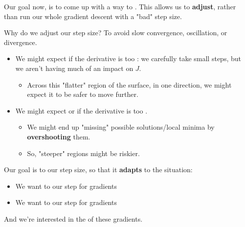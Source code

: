             Our goal now, is to come up with a  way to . This allows us to \textbf{adjust}, rather than run our whole gradient descent with a "bad" step size.

            Why do we adjust our step size? To avoid slow convergence, oscillation, or divergence.

            \begin{itemize}
                \item We might expect  if the derivative is too : we carefully take small steps, but we aren't having much of an impact on $J$.

                    \begin{itemize}
                        \item Across this "flatter" region of the surface, in one direction, we might expect it to be safer to move further.
                    \end{itemize}

                \item We might expect  or  if the derivative is too .
                    \begin{itemize}
                        \item We might end up "missing" possible solutions/local minima by \textbf{overshooting} them.
                        \item So, "steeper" regions might be riskier.
                    \end{itemize}
            \end{itemize}

            \begin{concept}
                Our goal is to  our step size, so that it \textbf{adapts} to the situation:

                \begin{itemize}
                    \item We want to  our step for  gradients
                    \item We want to  our step for  gradients
                \end{itemize}

                And we're interested in the  of these gradients.
            \end{concept}


